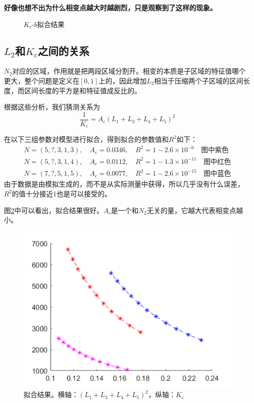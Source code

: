 \documentclass[12pt,a4paper]{article}
\begin{document}
\textbf{\color{blue} 好像也想不出为什么相变点越大时越剧烈，只是观察到了这样的现象。}

\begin{figure}[h]
\centering
{}
\caption{$K_c$-$b$拟合结果}
\label{fkb}
\end{figure}

\subsection{$L_2$和$K_c$之间的关系}

$N_2$对应的区域，作用就是把两段区域分割开。相变的本质是子区域的特征值哪个更大，整个问题是定义在$[0,1]$上的，因此增加$L_2$相当于压缩两个子区域的区间长度，而区间长度的平方是和特征值成反比的。

根据这些分析，我们猜测关系为
$$ \frac{1}{K_c} = A_c (L_1+L_3+L_4+L_5)^2 $$

在以下三组参数对模型进行拟合，得到拟合的参数值和$R^2$如下：
\begin{align*}
N=(5, ?, 3, 1, 3), \quad A_c = 0.0346, \quad R^2 = 1 - 2.6 \times 10^{-6} \quad \text{图中紫色} \\
N=(5, ?, 3, 1, 4), \quad A_c = 0.0112, \quad R^2 = 1 - 1.3 \times 10^{-11} \quad \text{图中红色} \\
N=(7, ?, 5, 1, 5), \quad A_c = 0.0077, \quad R^2 = 1 - 2.6 \times 10^{-15} \quad \text{图中蓝色}
\end{align*}
由于数据是由模拟生成的，而不是从实际测量中获得，所以几乎没有什么误差，$R^2$的值十分接近1也是可以接受的。

图\ref{fn2}中可以看出，拟合结果很好。$A_c$是一个和$N_2$无关的量，它越大代表相变点越小。
\begin{figure}[h]
\centering
\includegraphics[width=0.4\linewidth]{n2kc}
\caption{拟合结果。横轴：$(L_1+L_3+L_4+L_5)^2$，纵轴：$K_c$}
\label{fn2}
\end{figure}
\end{document}

